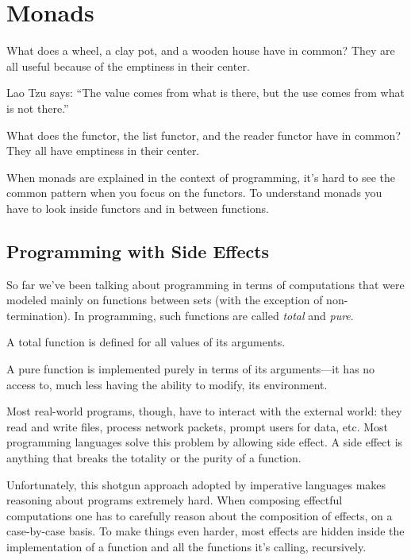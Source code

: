 \documentclass[DaoFP]{subfiles}
\begin{document}
\setcounter{chapter}{13}

\chapter{Monads}

What does a wheel, a clay pot, and a wooden house have in common? They are all useful because of the emptiness in their center. 

Lao Tzu says: ``The value comes from what is there, but the use comes from what is not there.''

What does the  functor, the list functor, and the reader functor have in common? They all have emptiness in their center. 

When monads are explained in the context of programming, it's hard to see the common pattern when you focus on the functors. To understand monads you have to look inside functors and in between functions.



\section{Programming with Side Effects}

So far we've been talking about programming in terms of computations that were modeled mainly on functions between sets (with the exception of non-termination). In programming, such functions are called \emph{total} and \emph{pure}. 

A total function is defined for all values of its arguments. 

A pure function is implemented purely in terms of its arguments---it has no access to, much less having the ability to modify, its environment. 

Most real-world programs, though, have to interact with the external world: they read and write files, process network packets, prompt users for data, etc. Most programming languages solve this problem by allowing side effect. A side effect is anything that breaks the totality or the purity of a function. 

Unfortunately, this shotgun approach adopted by imperative languages makes reasoning about programs extremely hard. When composing effectful computations one has to carefully reason about the composition of effects, on a case-by-case basis. To make things even harder, most effects are hidden inside the implementation of a function and all the functions it's calling, recursively.
\end{document}
